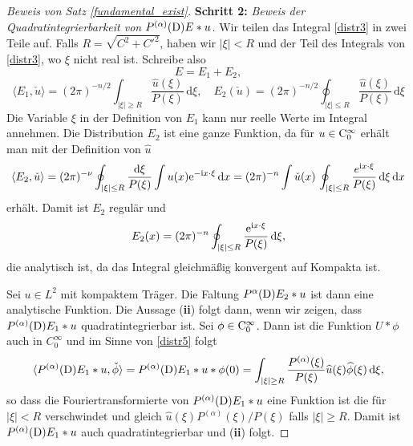 \begin{proof}[Beweis von Satz \ref{fundamental_exist}]
\textbf{Schritt 2:} \emph{Beweis der Quadratintegrierbarkeit von $P^{(\alpha)}(\mathrm D) E * u$.}
Wir teilen das Integral \eqref{distr3} in zwei Teile auf. Falls $R=\sqrt{C^2 + C'^2}$, haben wir $|\xi|<R$ und der Teil des Integrals von \eqref{distr3}, wo $\xi$ nicht real ist. Schreibe also 
\begin{equation}\label{distr4}
E=E_1 + E_2,
\end{equation}
\begin{equation}\label{distr5}
\langle E_1,\check u\rangle = (2\pi)^{-n/2} \int_{|\xi|\ge R} \frac{\widehat u(\xi)}{P(\xi)}\, \mathrm d\xi, \quad E_2(\check u)= (2\pi)^{-n/2} \oint_{|\xi|\le R} \frac{\widehat u(\xi)}{P(\xi)}\, \mathrm d\xi
\end{equation}
Die Variable $\xi$ in der Definition von $E_1$ kann nur reelle Werte im Integral annehmen. Die Distribution $E_2$ ist eine ganze Funktion, da für $u\in\mathrm C_0^\infty$ erhält man mit der Definition von $\widehat u$
\begin{equation}
\langle E_2, \check u\rangle = (2\pi)^{-\nu} \oint_{|\xi |\le R} \frac{\mathrm d\xi}{P(\xi)} \int u(x) \mathrm e^{-\mathrm i x\cdot\xi}\, \mathrm dx= (2\pi)^{-n} \int \check u(x) \, \oint_{|\xi|\le R} \frac{e^{\mathrm i x\cdot \xi}}{P(\xi)}\, \mathrm d\xi \, \mathrm dx
\end{equation}
erhält. Damit ist $E_2$ regulär und
\begin{equation}
E_2(x) = (2\pi)^{-n} \oint_{|\xi|\le R} \frac{\mathrm e^{\mathrm i x\cdot \xi}}{P(\xi)}\, \mathrm d\xi,
\end{equation}
die analytisch ist, da das Integral gleichmäßig konvergent auf Kompakta ist. 

Sei $u\in L^2$ mit kompaktem Träger. Die Faltung $P^{\alpha}(\mathrm D)E_2 *u$ ist dann eine analytische Funktion.  Die Aussage ({\bf ii}) folgt dann, wenn wir zeigen, dass $P^{(\alpha)}(\mathrm D) E_1 * u$ quadratintegrierbar ist.  Sei $\phi \in\mathrm C_0^\infty$. Dann ist die Funktion $U*\phi$ auch in $C_0^\infty$ und im Sinne von \eqref{distr5} folgt
\begin{equation}
\langle P^{(\alpha)} (\mathrm D) E_1 * u, \check \phi\rangle  = P^{(\alpha)}(\mathrm D) E_1 * u * \phi(0) = \int_{|\xi| \ge R} \frac{P^{(\alpha)}(\xi)}{P(\xi)} \widehat u(\xi) \widehat \phi(\xi) \, \mathrm d\xi,
\end{equation}     
so dass die Fouriertransformierte von $P^{(\alpha)}(\mathrm D) E_1 * u$ eine Funktion ist die für $|\xi|<R$ verschwindet und gleich $\widehat u(\xi)P^{(\alpha)}(\xi)/P(\xi)$ falls $|\xi|\ge R$. Damit ist $P^{(\alpha)}(\mathrm D) E_1 * u$ auch quadratintegrierbar und ({\bf ii}) folgt.


\end{proof}
